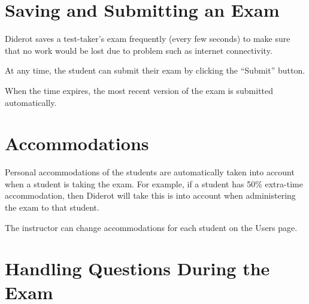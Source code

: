 \section{Saving and Submitting an Exam}
\label{ch:quiz::submit}

\begin{cluster}
\label{grp:grm:quiz::saves}

\begin{gram}
\label{grm:quiz::saves}
Diderot saves a test-taker's exam frequently (every few seconds) to make sure that no work would be lost due to problem such as internet connectivity.  

At any time, the student can submit their exam by clicking the ``Submit'' button.

When the time expires, the most recent version of the exam is submitted automatically.

\end{gram}
\end{cluster}


\section{Accommodations}
\label{ch:quiz::accommodations}

\begin{cluster}
\label{grp:grm:quiz::personal}

\begin{gram}
\label{grm:quiz::personal}
Personal accommodations of the students are automatically taken into account when a student is taking the exam.  For example, if a student has 50\% extra-time accommodation, then Diderot will take this is into account when administering the exam to that student.  

The instructor can change accommodations for each student on the Users page. 

\end{gram}
\end{cluster}


\section{Handling Questions During the Exam}
\label{sec:quiz::handling-questions-during-the-exam}

